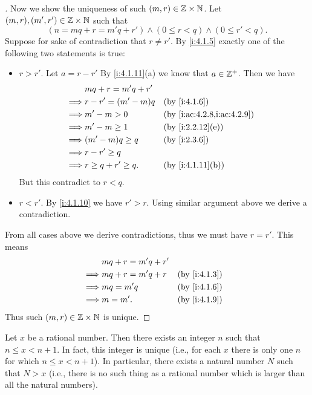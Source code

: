 \begin{proof}[]
  Now we show the uniqueness of such \((m, r) \in \mathbb{Z} \times \mathbb{N}\).
  Let \((m, r), (m', r') \in \mathbb{Z} \times \mathbb{N}\) such that
  \[
    (n = mq + r = m'q + r') \land (0 \leq r < q) \land (0 \leq r' < q).
  \]
  Suppose for sake of contradiction that \(r \neq r'\).
  By \cref{i:4.1.5} exactly one of the following two statements is true:
  \begin{itemize}
    \item \(r > r'\).
          Let \(a = r - r'\)
          By \cref{i:4.1.11}(a) we know that \(a \in \mathbb{Z}^+\).
          Then we have
          \begin{align*}
                     & mq + r = m'q + r'                                     \\
            \implies & r - r' = (m' - m)q    &  & \by{i:4.1.6}               \\
            \implies & m' - m > 0            &  & \by{i:ac:4.2.8,i:ac:4.2.9} \\
            \implies & m' - m \geq 1         &  & \by{i:2.2.12}[e]           \\
            \implies & (m' - m)q \geq q      &  & \by{i:2.3.6}               \\
            \implies & r - r' \geq q                                         \\
            \implies & r \geq q + r' \geq q. &  & \by{i:4.1.11}[b]
          \end{align*}
          But this contradict to \(r < q\).
    \item \(r < r'\).
          By \cref{i:4.1.10} we have \(r' > r\).
          Using similar argument above we derive a contradiction.
  \end{itemize}
  From all cases above we derive contradictions, thus we must have \(r = r'\).
  This means
  \begin{align*}
             & mq + r = m'q + r'                   \\
    \implies & mq + r = m'q + r  &  & \by{i:4.1.3} \\
    \implies & mq = m'q          &  & \by{i:4.1.6} \\
    \implies & m = m'.           &  & \by{i:4.1.9}
  \end{align*}
  Thus such \((m, r) \in \mathbb{Z} \times \mathbb{N}\) is unique.
\end{proof}

\begin{prop}\label{i:4.4.1}
  Let \(x\) be a rational number.
  Then there exists an integer \(n\) such that \(n \leq x < n + 1\).
  In fact, this integer is unique (i.e., for each \(x\) there is only one \(n\) for which \(n \leq x < n + 1\)).
  In particular, there exists a natural number \(N\) such that \(N > x\)
  (i.e., there is no such thing as a rational number which is larger than all the natural numbers).
\end{prop}

